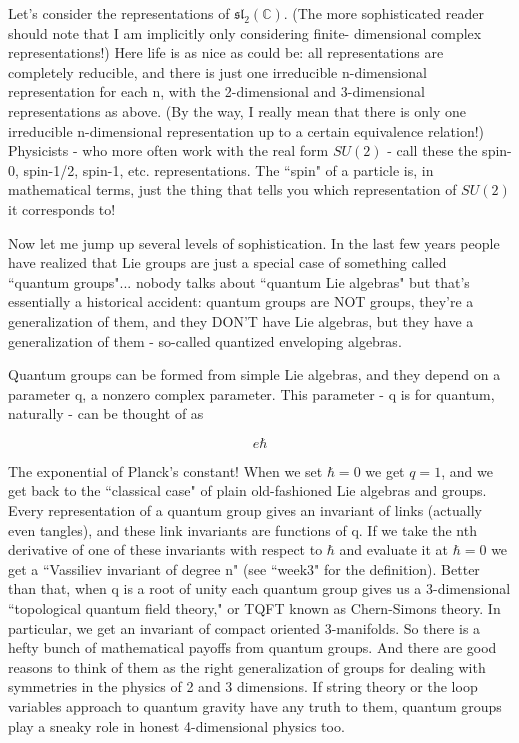 Let's consider the representations of $\mathfrak{sl}_2(\mathbb{C})$. (The more sophisticated reader should note that I am implicitly only considering finite- dimensional complex representations!) Here life is as nice as could be: all representations are completely reducible, and there is just one irreducible n-dimensional representation for each n, with the 2-dimensional and 3-dimensional representations as above. (By the way, I really mean that there is only one irreducible n-dimensional representation up to a certain equivalence relation!) Physicists - who more often work with the real form $SU(2)$ - call these the spin-0, spin-1/2, spin-1, etc. representations. The ``spin" of a particle is, in mathematical terms, just the thing that tells you which representation of $SU(2)$ it corresponds to!

Now let me jump up several levels of sophistication. In the last few years people have realized that Lie groups are just a special case of something called ``quantum groups"... nobody talks about ``quantum Lie algebras" but that's essentially a historical accident: quantum groups are NOT groups, they're a generalization of them, and they DON'T have Lie algebras, but they have a generalization of them - so-called quantized enveloping algebras.

Quantum groups can be formed from simple Lie algebras, and they depend on a parameter q, a nonzero complex parameter. This parameter - q is for quantum, naturally - can be thought of as

$$e\hbar$$

The exponential of Planck's constant! When we set $\hbar = 0$ we get $q = 1$, and we get back to the ``classical case" of plain old-fashioned Lie algebras and groups. Every representation of a quantum group gives an invariant of links (actually even tangles), and these link invariants are functions of q. If we take the nth derivative of one of these invariants with respect to $\hbar$ and evaluate it at $\hbar = 0$ we get a ``Vassiliev invariant of degree n" (see ``week3" for the definition). Better than that, when q is a root of unity each quantum group gives us a 3-dimensional ``topological quantum field theory," or TQFT known as Chern-Simons theory. In particular, we get an invariant of compact oriented 3-manifolds. So there is a hefty bunch of mathematical payoffs from quantum groups. And there are good reasons to think of them as the right generalization of groups for dealing with symmetries in the physics of 2 and 3 dimensions. If string theory or the loop variables approach to quantum gravity have any truth to them, quantum groups play a sneaky role in honest 4-dimensional physics too.

